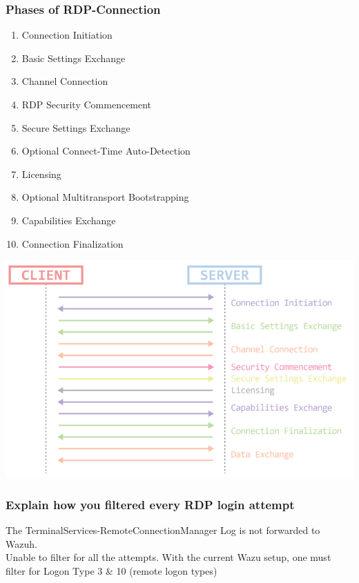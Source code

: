 \subsubsection{Phases of RDP-Connection}
\begin{enumerate}
    \item Connection Initiation
    \item Basic Settings Exchange
    \item Channel Connection
    \item RDP Security Commencement
    \item Secure Settings Exchange
    \item Optional Connect-Time Auto-Detection
    \item Licensing
    \item Optional Multitransport Bootstrapping
    \item Capabilities Exchange
    \item Connection Finalization
\end{enumerate}
\begin{center}
    \includegraphics[width=1.0\linewidth]{./img/04-windows_logs/rdp_phases}
     \vspace{-8pt}
\end{center}

\subsubsection{Explain how you filtered every RDP login attempt}
The TerminalServices-RemoteConnectionManager Log is not forwarded to Wazuh.\\
Unable to filter for all the attempts. With the current Wazu setup, one must filter for Logon Type 3 \& 10 (remote logon types)\\

